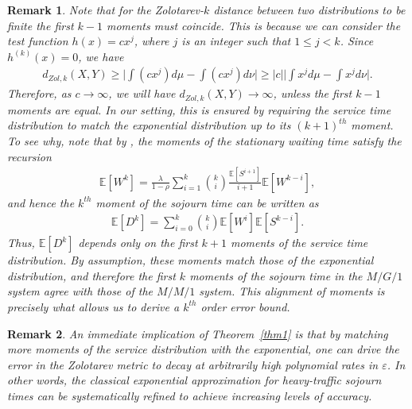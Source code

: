\documentclass[11pt,letterpaper,reqno]{article}
\theoremstyle{thmstyleone}%
\theoremstyle{thmstyletwo}%
\newtheorem{remark}{Remark}%
\theoremstyle{thmstylethree}%
\numberwithin{equation}{section}
\begin{document}
\begin{remark}\label{remark1}
Note that for the Zolotarev-$k$ distance between two distributions to be finite the first $k-1$ moments must coincide. This is because we can consider the test function $h(x)=c x^j$, where $j$ is an integer such that $1 \leq j<k$. Since $h^{(k)}(x)=0$, we have
\begin{align*}
    d_{Zol,k}(X,Y) \geq \bigg|\int (cx^j) d\mu-\int (cx^j) d\nu \bigg| \geq |c|\bigg|\int x^j d\mu-\int x^j d\nu \bigg|.
\end{align*}
Therefore, as $c \to \infty$, we will have $d_{Zol,k}(X,Y) \to \infty$, unless the first $k-1$ moments are equal.
In our setting, this is ensured by requiring the service time distribution to match the exponential distribution up to its $(k+1)^{th}$ moment. To see why, note that by \cite[Theorem 5]{Takacs}, the moments of the stationary waiting time satisfy the recursion
\begin{align}\label{wtrecursion}
    \mathbb E[W^k] = \frac\lambda{1-\rho}\sum_{i=1}^k\binom ki \frac{\mathbb E[S^{i+1}]}{i+1}\mathbb E[W^{k-i}],
\end{align}
and hence the $k^{th}$ moment of the sojourn time can be written as
\begin{align}\label{strecursion}
    \mathbb E[D^k] = \sum_{i=0}^k \binom ki \mathbb E[W^i]\mathbb E [S^{k-i}].
\end{align}
Thus, $\mathbb{E}[D^k]$ depends only on the first $k+1$ moments of the service time distribution. By assumption, these moments match those of the exponential distribution, and therefore the first $k$ moments of the sojourn time in the $M/G/1$ system agree with those of the $M/M/1$ system. This alignment of moments is precisely what allows us to derive a $k^{th}$ order error bound.
\end{remark}

\begin{remark}
An immediate implication of Theorem~\ref{thm1} is that by matching more moments of the service distribution with the exponential, one can drive the error in the Zolotarev metric to decay at arbitrarily high polynomial rates in $\varepsilon$. In other words, the classical exponential approximation for heavy-traffic sojourn times can be systematically refined to achieve increasing levels of accuracy.
\end{remark}
\end{document}
